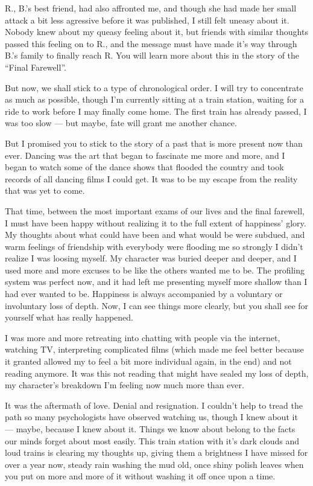 R., B.'s best friend, had also affronted me, and though she had made her small attack a bit less agressive before it was published, I still felt uneasy about it. Nobody knew about my queasy feeling about it, but friends with similar thoughts passed this feeling on to R., and the message must have made it's way through B.'s family to finally reach R. You will learn more about this in the story of the \enquote{Final Farewell}.

But now, we shall stick to a type of chronological order. I will try to concentrate as much as possible, though I'm currently sitting at a train station, waiting for a ride to work before I may finally come home. The first train has already passed, I was too slow --- but maybe, fate will grant me another chance.

But I promised you to stick to the story of a past that is more present now than ever. Dancing was the art that began to fascinate me more and more, and I began to watch some of the dance shows that flooded the country and took records of all dancing films I could get. It was to be my escape from the reality that was yet to come.

That time, between the most important exams of our lives and the final farewell, I must have been happy without realizing it to the full extent of happiness' glory. My thoughts about what could have been and what would be were subdued, and warm feelings of friendship with everybody were flooding me so strongly I didn't realize I was loosing myself. My character was buried deeper and deeper, and I used more and more excuses to be like the others wanted me to be. The profiling system was perfect now, and it had left me presenting myself more shallow than I had ever wanted to be. 
Happiness is always accompanied by a voluntary or involuntary loss of depth.
Now, I can see things more clearly, but you shall see for yourself what has really happened.

I was more and more retreating into chatting with people via the internet, watching TV, interpreting complicated films (which made me feel better because it granted allowed my to feel a bit more individual again, in the end) and not reading anymore. 
It was this not reading that might have sealed my loss of depth, my character's breakdown I'm feeling now much more than ever.

It was the aftermath of love. Denial and resignation. I couldn't help to tread the path so many psychologists have observed watching us, though I knew about it --- maybe, because I knew about it. Things we know about belong to the facts our minds forget about most easily. 
This train station with it's dark clouds and loud trains is clearing my thoughts up, giving them a brightness I have missed for over a year now, steady rain washing the mud old, once shiny polish leaves when you put on more and more of it without washing it off once upon a time.

